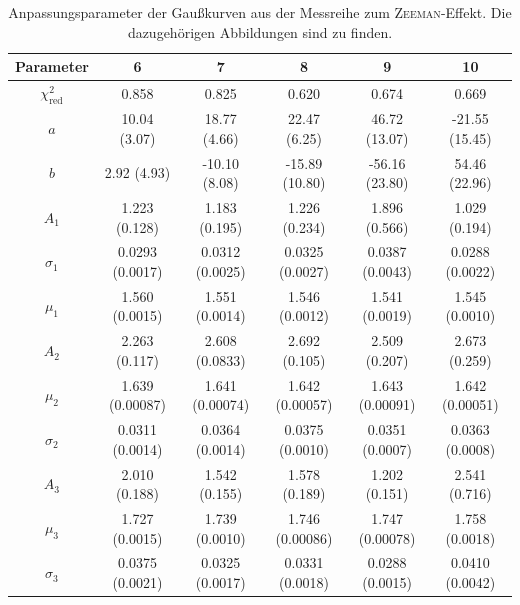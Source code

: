 \begin{table}[ht]
    \vspace{1em}
    \begin{tabular}{c *{5}{c}}
        \toprule
        Parameter & {6} & {7} & {8} & {9} & {10} \\
        \midrule
        $\chi_\text{red}^2$ & 0.858 & 0.825 & 0.620 & 0.674 & 0.669 \\
        $a$         & 10.04 (3.07)      & 18.77 (4.66)      & 22.47 (6.25)      & 46.72 (13.07)     & -21.55 (15.45) \\
        $b$         & 2.92 (4.93)       & -10.10 (8.08)     & -15.89 (10.80)    & -56.16 (23.80)    & 54.46 (22.96) \\
        $A_1$       & 1.223 (0.128)     & 1.183 (0.195)     & 1.226 (0.234)     & 1.896 (0.566)     & 1.029 (0.194) \\
        $\sigma_1$  & 0.0293 (0.0017)   & 0.0312 (0.0025)   & 0.0325 (0.0027)   & 0.0387 (0.0043)   & 0.0288 (0.0022) \\
        $\mu_1$     & 1.560 (0.0015)    & 1.551 (0.0014)    & 1.546 (0.0012)    & 1.541 (0.0019)    & 1.545 (0.0010) \\
        $A_2$       & 2.263 (0.117)     & 2.608 (0.0833)    & 2.692 (0.105)     & 2.509 (0.207)     & 2.673 (0.259) \\
        $\mu_2$     & 1.639 (0.00087)   & 1.641 (0.00074)   & 1.642 (0.00057)   & 1.643 (0.00091)   & 1.642 (0.00051) \\
        $\sigma_2$  & 0.0311 (0.0014)   & 0.0364 (0.0014)   & 0.0375 (0.0010)   & 0.0351 (0.0007)   & 0.0363 (0.0008) \\
        $A_3$       & 2.010 (0.188)     & 1.542 (0.155)     & 1.578 (0.189)     & 1.202 (0.151)     & 2.541 (0.716) \\
        $\mu_3$     & 1.727 (0.0015)    & 1.739 (0.0010)    & 1.746 (0.00086)   & 1.747 (0.00078)   & 1.758 (0.0018) \\
        $\sigma_3$  & 0.0375 (0.0021)   & 0.0325 (0.0017)   & 0.0331 (0.0018)   & 0.0288 (0.0015)   & 0.0410 (0.0042) \\
        \bottomrule
    \end{tabular}
    \caption[Anpassungsparameter zur Messreihe \textsc{Zeeman}-Effekt]{Anpassungsparameter der Gaußkurven aus der Messreihe zum \textsc{Zeeman}-Effekt. Die dazugehörigen Abbildungen sind  zu finden.}\label{tab:langzeeman-fit}
\end{table}
\normalsize
\clearpage

